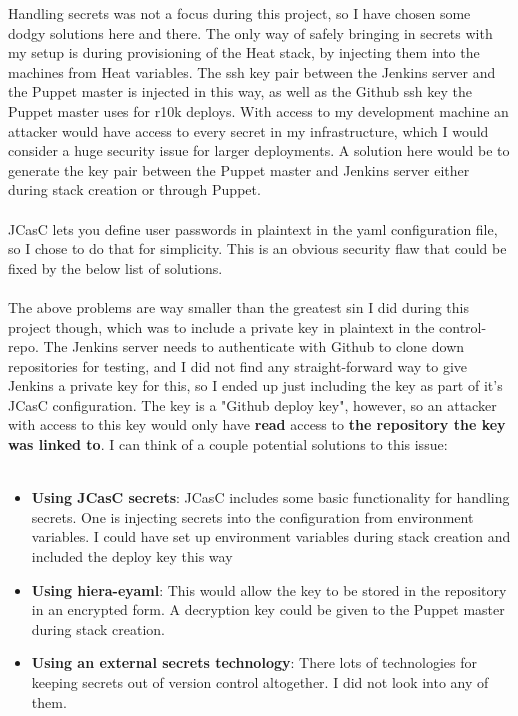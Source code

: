 Handling secrets was not a focus during this project, so I have chosen some dodgy solutions here and there. The only way of safely bringing in secrets with my setup is during provisioning of the Heat stack, by injecting them into the machines from Heat variables. The ssh key pair between the Jenkins server and the Puppet master is injected in this way, as well as the Github ssh key the Puppet master uses for r10k deploys. With access to my development machine an attacker would have access to every secret in my infrastructure, which I would consider a huge security issue for larger deployments. A solution here would be to generate the key pair between the Puppet master and Jenkins server either during stack creation or through Puppet.
\\
\\
JCasC lets you define user passwords in plaintext in the yaml configuration file, so I chose to do that for simplicity. This is an obvious security flaw that could be fixed by the below list of solutions.
\\
\\
The above problems are way smaller than the greatest sin I did during this project though, which was to include a private key in plaintext in the control-repo. The Jenkins server needs to authenticate with Github to clone down repositories for testing, and I did not find any straight-forward way to give Jenkins a private key for this, so I ended up just including the key as part of it's JCasC configuration. The key is a "Github deploy key"\cite{githubdeploykeyarticle}, however, so an attacker with access to this key would only have \textbf{read} access to \textbf{the repository the key was linked to}. I can think of a couple potential solutions to this issue:
\\
\\
\begin{itemize}  
\item \textbf{Using JCasC secrets}: JCasC includes some basic functionality for handling secrets. One is injecting secrets into the configuration from environment variables. I could have set up environment variables during stack creation and included the deploy key this way
\item \textbf{Using hiera-eyaml}: This would allow the key to be stored in the repository in an encrypted form. A decryption key could be given to the Puppet master during stack creation.
\item \textbf{Using an external secrets technology}: There lots of technologies for keeping secrets out of version control altogether. I did not look into any of them.
\end{itemize}

